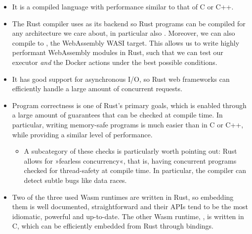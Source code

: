 \begin{itemize}
    \item It is a compiled language with performance similar to that of C or C++.
    \item The Rust compiler uses  as its backend so Rust programs can be compiled for any architecture we care about, in particular also . Moreover, we can also compile to , the WebAssembly WASI target. This allows us to write highly performant WebAssembly modules in Rust, such that we can test our executor \emph{and} the Docker actions under the best possible conditions.
    \item It has good support for asynchronous I/O, so Rust web frameworks can efficiently handle a large amount of concurrent requests.
    \item Program correctness is one of Rust's primary goals, which is enabled through a large amount of guarantees that can be checked at compile time. In particular, writing memory-safe programs is much easier than in C or C++, while providing a similar level of performance.
    \begin{itemize}
        \item A subcategory of these checks is particularly worth pointing out: Rust allows for »fearless concurrency«, that is, having concurrent programs checked for thread-safety at compile time. In particular, the compiler can detect subtle bugs like data races.
    \end{itemize}
    \item Two of the three used Wasm runtimes are written in Rust, so embedding them is well documented, straightforward and their APIs tend to be the most idiomatic, powerful and up-to-date. The other Wasm runtime, , is written in C, which can be efficiently embedded from Rust through bindings.
\end{itemize}

